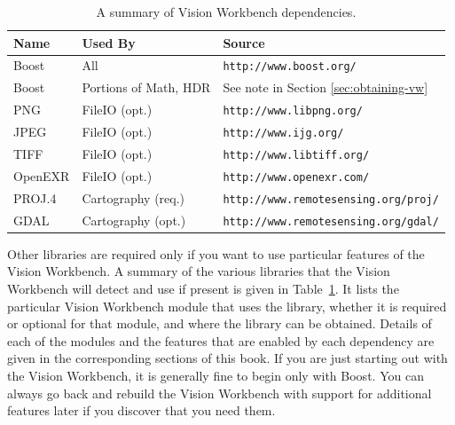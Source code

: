 \begin{table}[t]\begin{centering}
\begin{tabular}{|l|l|l|} \hline
Name    & Used By            & Source                                    \\ \hline \hline
Boost   & All                & \verb#http://www.boost.org/#              \\ \hline
Boost   & Portions of Math, HDR & See note in Section \ref{sec:obtaining-vw}              \\ \hline
PNG     & FileIO (opt.)      & \verb#http://www.libpng.org/#             \\ \hline
JPEG    & FileIO (opt.)      & \verb#http://www.ijg.org/#                \\ \hline
TIFF    & FileIO (opt.)      & \verb#http://www.libtiff.org/#            \\ \hline
OpenEXR & FileIO (opt.)      & \verb#http://www.openexr.com/#            \\ \hline
PROJ.4  & Cartography (req.) & \verb#http://www.remotesensing.org/proj/# \\ \hline
GDAL    & Cartography (opt.) & \verb#http://www.remotesensing.org/gdal/# \\ \hline
\end{tabular}
\caption{A summary of Vision Workbench dependencies.}
\label{tbl:dependencies}
\end{centering}\end{table}

Other libraries are required only if you want to use particular
features of the Vision Workbench.  A summary of the various libraries
that the Vision Workbench will detect and use if present is given in
Table~\ref{tbl:dependencies}.  It lists the particular Vision
Workbench module that uses the library, whether it is required or
optional for that module, and where the library can be obtained.
Details of each of the modules and the features that are enabled by
each dependency are given in the corresponding sections of this book.
If you are just starting out with the Vision Workbench, it is
generally fine to begin only with Boost.  You can always go back and 
rebuild the Vision Workbench with support for additional features 
later if you discover that you need them.

